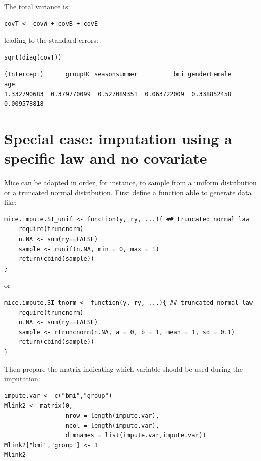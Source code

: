 \documentclass[12pt]{article}
\begin{document}
The total variance is:
\lstset{language=r,label= ,caption= ,captionpos=b,numbers=none}
\begin{lstlisting}
covT <- covW + covB + covE
\end{lstlisting}

leading to the standard errors:
\lstset{language=r,label= ,caption= ,captionpos=b,numbers=none}
\begin{lstlisting}
sqrt(diag(covT))
\end{lstlisting}
\begin{verbatim}
(Intercept)      groupHC seasonsummer          bmi genderFemale          age 
1.332790683  0.379770099  0.527089351  0.063722009  0.338852458  0.009578818
\end{verbatim}

\clearpage

\section{Special case: imputation using a specific law and no covariate}
\label{sec:orgde8e1b1}
Mice can be adapted in order, for instance, to sample from a uniform
distribution or a truncated normal distribution. First define a
function able to generate data like:
\lstset{language=r,label= ,caption= ,captionpos=b,numbers=none}
\begin{lstlisting}
mice.impute.SI_unif <- function(y, ry, ...){ ## truncated normal law
	require(truncnorm)
	n.NA <- sum(ry==FALSE)
	sample <- runif(n.NA, min = 0, max = 1)
	return(cbind(sample))
}
\end{lstlisting}

or

\lstset{language=r,label= ,caption= ,captionpos=b,numbers=none}
\begin{lstlisting}
mice.impute.SI_tnorm <- function(y, ry, ...){ ## truncated normal law
	require(truncnorm)
	n.NA <- sum(ry==FALSE)
	sample <- rtruncnorm(n.NA, a = 0, b = 1, mean = 1, sd = 0.1)
	return(cbind(sample))
}
\end{lstlisting}
Then prepare the matrix indicating which variable should be used
during the imputation:
\lstset{language=r,label= ,caption= ,captionpos=b,numbers=none}
\begin{lstlisting}
impute.var <- c("bmi","group")
Mlink2 <- matrix(0, 
				 nrow = length(impute.var), 
				 ncol = length(impute.var), 
				 dimnames = list(impute.var,impute.var))
Mlink2["bmi","group"] <- 1
Mlink2
\end{lstlisting}
\end{document}
